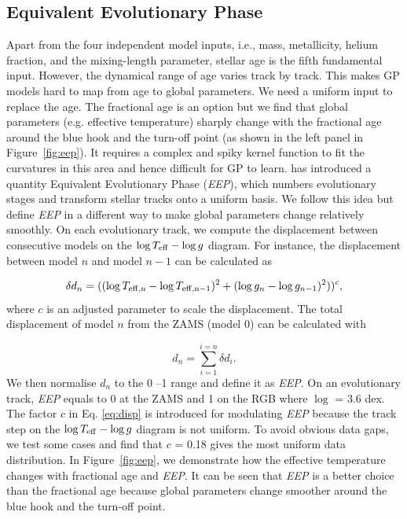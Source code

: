 \subsection{Equivalent Evolutionary Phase}

Apart from the four independent model inputs, i.e., mass, metallicity, helium fraction, and the mixing-length parameter, stellar age is the fifth fundamental input. However, the dynamical range of age varies track by track. This makes GP models hard to map from age to global parameters. 
%
We need a uniform input to replace the age. The fractional age is an option but we find that global parameters (e.g. effective temperature) sharply change with the fractional age around the blue hook and the turn-off point (as shown in the left panel in Figure~\ref{fig:eep}). It requires a complex and spiky kernel function to fit the curvatures in this area and hence difficult for GP to learn. \citet{2016ApJS..222....8D} has introduced a quantity Equivalent Evolutionary Phase ({\it EEP}), which numbers evolutionary stages and transform stellar tracks onto a uniform basis. We follow this idea but define {\it EEP} in a different way to make global parameters change relatively smoothly.
%
On each evolutionary track, we compute the displacement between consecutive models on the $\log T_{\rm eff} - \log g$ diagram. For instance, the displacement between model $n$ and model $n-1$ can be calculated as

\begin{equation}\label{eq:disp}
\delta d_{n} = ((\log T_{\rm eff, n} - \log T_{\rm eff, n-1}) ^{2} + (\log g _{n} - \log g_{n-1})^{2}))^{c},
\end{equation}
where $c$ is an adjusted parameter to scale the displacement. 
%
The total displacement of model $n$ from the ZAMS (model 0) can be calculated with

\begin{equation}
d_{n} = \sum_{i = 1}^{i = n} \delta d_{i} .
\end{equation}
We then normalise $d_{n}$ to the 0 --1 range and define it as {\it EEP}. On an evolutionary track, {\it EEP} equals to 0 at the ZAMS and 1 on the RGB where $\log$ = 3.6 dex. The factor $c$ in Eq. \ref{eq:disp} is introduced for modulating {\it EEP} because the track step on the $\log T_{\rm eff} - \log g$ diagram is not uniform. To avoid obvious data gaps, we test some cases and find that $c$ = 0.18 gives the most uniform data distribution.
%
In Figure~\ref{fig:eep}, we demonstrate how the effective temperature changes with fractional age and {\it EEP}. It can be seen that {\it EEP} is a better choice than the fractional age because global parameters change smoother around the blue hook and the turn-off point.

